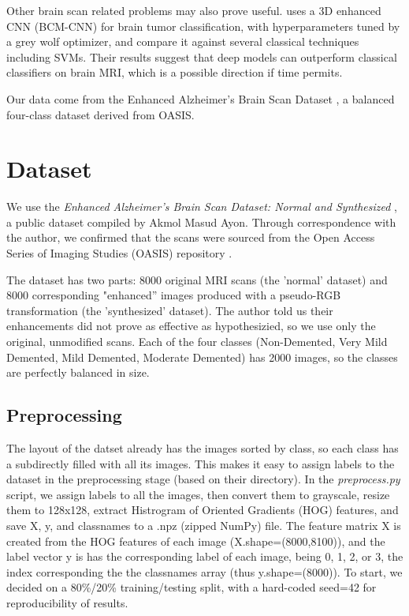 \documentclass[11pt]{article}
\begin{document}
Other brain scan related problems may also prove useful. \citet{bcmcnn2023} uses a 3D enhanced CNN (BCM-CNN) for brain tumor classification, with hyperparameters tuned by a grey wolf optimizer, and compare it against several classical techniques including SVMs. Their results suggest that deep models can outperform classical classifiers on brain MRI, which is a possible direction if time permits.

Our data come from the Enhanced Alzheimer's Brain Scan Dataset \citep{masud2024}, a balanced four-class dataset derived from OASIS.

\section{Dataset}

We use the \textit{Enhanced Alzheimer's Brain Scan Dataset: Normal and Synthesized} \citep{masud2024}, a public dataset compiled by Akmol Masud Ayon. Through correspondence with the author, we confirmed that the scans were sourced from the Open Access Series of Imaging Studies (OASIS) repository \citep{marcus2007}.

The dataset has two parts: 8000 original MRI scans (the 'normal' dataset) and 8000 corresponding "enhanced'' images produced with a pseudo-RGB transformation (the 'synthesized' dataset). The author told us their enhancements did not prove as effective as hypothesizied, so we use only the original, unmodified scans. Each of the four classes (Non-Demented, Very Mild Demented, Mild Demented, Moderate Demented) has 2000 images, so the classes are perfectly balanced in size.

\subsection{Preprocessing}

The layout of the datset already has the images sorted by class, so each class has a subdirectly filled with all its images. This makes it easy to assign labels to the dataset in the preprocessing stage (based on their directory). In the \textit{preprocess.py} script, we assign labels to all the images, then convert them to grayscale, resize them to 128x128, extract Histrogram of Oriented Gradients (HOG) features, and save X, y, and classnames to a .npz (zipped NumPy) file. The feature matrix X is created from the HOG features of each image (X.shape=(8000,8100)), and the label vector y is has the corresponding label of each image, being 0, 1, 2, or 3, the index corresponding the the classnames array (thus y.shape=(8000)). To start, we decided on a 80\%/20\% training/testing split, with a hard-coded seed=42 for reproducibility of results.
\end{document}
